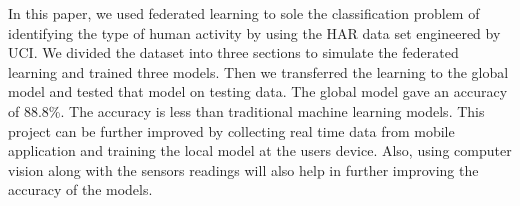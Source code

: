 \documentclass[12pt,conference]{IEEEtran}
\begin{document}
 In this paper, we used federated learning to sole the classification problem of identifying the type of human activity by using the HAR data set engineered by UCI. We divided the dataset into three sections to simulate the federated learning and trained three models. Then we transferred the learning to the global model and tested that model on testing data. The global model gave an accuracy of 88.8\%. The accuracy is less than traditional machine learning models. This project can be further improved by collecting real time data from mobile application and training the local model at the users device. Also, using computer vision along with the sensors readings will also help in further improving the accuracy of the models.



% 

\end{document}
